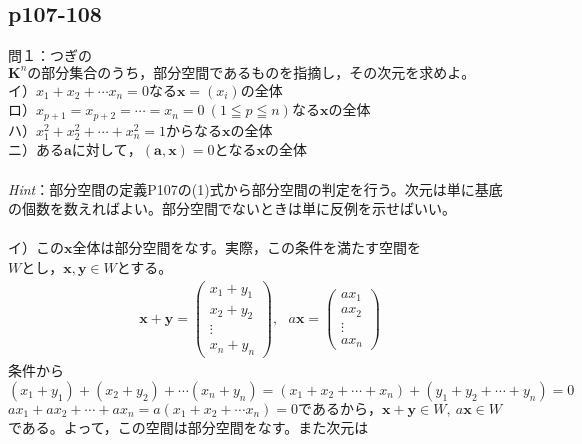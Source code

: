 \documentclass[dvipdfmx,uplatex,11pt]{jsarticle}
\begin{document}
\subsection{p107-108}
\noindent
問１：つぎの$\bm{K}^nの部分集合のうち，部分空間であるものを指摘し，その次元を求めよ。$\\
イ）$x_1+x_2+ \cdots x_n=0なる\bm{x}=(x_i)の全体$\\
ロ）$x_{p+1}=x_{p+2}= \cdots =x_{n}=0~(1 \leqq p \leqq n)なる\bm{x}の全体$\\
ハ）$x_1^2+x_2^2+\cdots +x_n^2=1からなる\bm{x}の全体$\\
ニ）$ある\bm{a}に対して，(\bm{a,x})=0となる\bm{x}の全体$\\ \\
\textsl{Hint}：部分空間の定義P107の(1)式から部分空間の判定を行う。次元は単に基底の個数を数えればよい。部分空間でないときは単に反例を示せばいい。\\
\dotfill \\
イ）この$\bm{x}全体は$部分空間をなす。実際，この条件を満たす空間を$Wとし，\bm{x,y} \in W$とする。
\begin{eqnarray*}
\bm{x}+\bm{y}=
\begin{pmatrix}
x_1+y_1 \\
x_2+y_2 \\
\vdots \\
x_n+y_n
\end{pmatrix}
,~~~
a\bm{x}=
\begin{pmatrix}
ax_1 \\
ax_2 \\
\vdots \\
ax_n
\end{pmatrix}
\end{eqnarray*}
条件から$(x_1+y_1)+(x_2+y_2)+\cdots (x_n+y_n)=(x_1+x_2+\cdots +x_n)+(y_1+y_2+\cdots +y_n)=0$\\
$ax_1+ax_2+ \cdots +ax_n=a(x_1+x_2+\cdots x_n)=0であるから，\bm{x}+\bm{y} \in W,~a\bm{x} \in W$である。よって，この空間は部分空間をなす。また次元は
\end{document}
